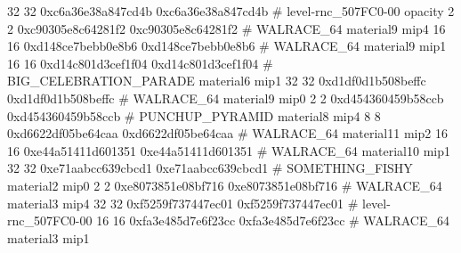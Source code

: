32 32 0xc6a36e38a847cd4b 0xc6a36e38a847cd4b # level-rnc_507FC0-00 opacity
2 2 0xc90305e8c64281f2 0xc90305e8c64281f2 # WALRACE_64 material9 mip4
16 16 0xd148ce7bebb0e8b6 0xd148ce7bebb0e8b6 # WALRACE_64 material9 mip1
16 16 0xd14c801d3cef1f04 0xd14c801d3cef1f04 # BIG_CELEBRATION_PARADE material6 mip1
32 32 0xd1df0d1b508beffc 0xd1df0d1b508beffc # WALRACE_64 material9 mip0
2 2 0xd454360459b58ccb 0xd454360459b58ccb # PUNCHUP_PYRAMID material8 mip4
8 8 0xd6622df05be64caa 0xd6622df05be64caa # WALRACE_64 material11 mip2
16 16 0xe44a51411d601351 0xe44a51411d601351 # WALRACE_64 material10 mip1
32 32 0xe71aabcc639cbcd1 0xe71aabcc639cbcd1 # SOMETHING_FISHY material2 mip0
2 2 0xe8073851e08bf716 0xe8073851e08bf716 # WALRACE_64 material3 mip4
32 32 0xf5259f737447ec01 0xf5259f737447ec01 # level-rnc_507FC0-00
16 16 0xfa3e485d7e6f23cc 0xfa3e485d7e6f23cc # WALRACE_64 material3 mip1
